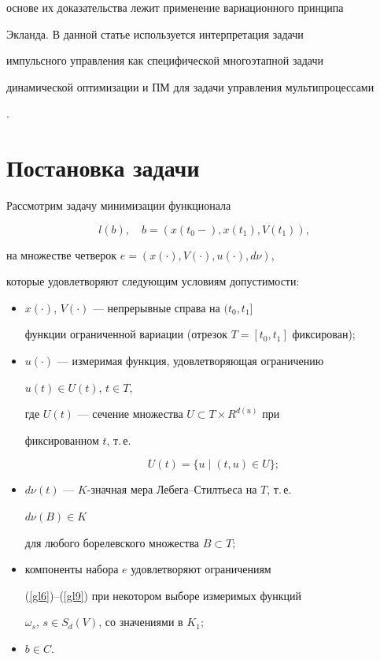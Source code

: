 основе их доказательства лежит применение вариационного принципа


Экланда. В данной статье используется интерпретация задачи


импульсного управления как специфической многоэтапной задачи


динамической оптимизации и ПМ для задачи управления мультипроцессами


\cite{K.B.}.





\section{Постановка задачи}





Рассмотрим задачу минимизации функционала


$$


l(b),\quad b=(x(t_0-),x(t_1),V(t_1)),


$$


на множестве четверок $e=(x(\cdot),V(\cdot),u(\cdot),d\nu)$,


которые удовлетворяют следующим условиям допустимости:


\begin{itemize}


\item[1)] $x(\cdot)$, $V(\cdot)$ --- непрерывные справа на $(t_0,t_1]$


функции ограниченной вариации (отрезок $T=[t_0,t_1]$ фиксирован);


\item[2)] $u(\cdot)$ --- измеримая функция, удовлетворяющая ограничению


$u(t) \in U(t)$, $t\in T$,


где $U(t)$ --- сечение множества $U \subset T\times R^{d(u)}$ при


фиксированном $t$, т.\,е.


$$


U(t)=\{u\mid (t,u) \in U\};


$$


\item[3)] $d\nu(t)$ --- $K$-значная мера Лебега--Стилтьеса на $T$, т.\,е.


$d\nu(B) \in K$


для любого борелевского множества $B \subset T$;


\item[4)] компоненты набора $e$ удовлетворяют ограничениям


(\ref{gl6})--(\ref{gl9}) при некотором выборе измеримых функций


$\omega_s$, $s\in S_d(V)$, со значениями в $K_1$;


\item[5)] $b\in C$.


\end{itemize}





